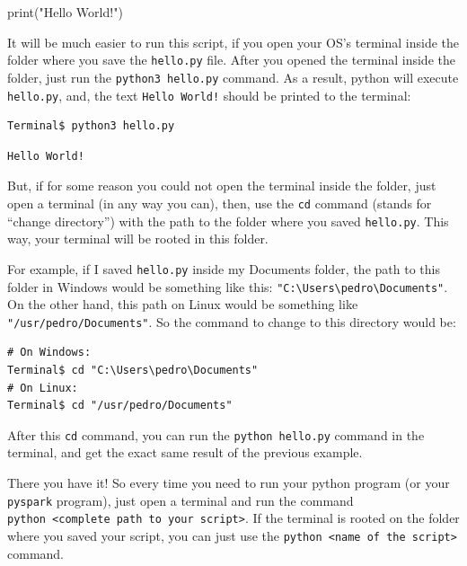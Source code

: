 \documentclass[
  11pt,
  letterpaper,
  DIV=11,
  numbers=noendperiod]{scrreprt}
\newenvironment{Shaded}{\begin{snugshade}}{\end{snugshade}}
\newcommand{\BuiltInTok}[1]{\textcolor[rgb]{0.00,0.23,0.31}{#1}}
\newcommand{\NormalTok}[1]{\textcolor[rgb]{0.00,0.23,0.31}{#1}}
\newcommand{\StringTok}[1]{\textcolor[rgb]{0.13,0.47,0.30}{#1}}
\begin{document}
\begin{Shaded}
\begin{Highlighting}[]
\BuiltInTok{print}\NormalTok{(}\StringTok{"Hello World!"}\NormalTok{)}
\end{Highlighting}
\end{Shaded}

It will be much easier to run this script, if you open your OS's
terminal inside the folder where you save the \texttt{hello.py} file.
After you opened the terminal inside the folder, just run the
\texttt{python3\ hello.py} command. As a result, python will execute
\texttt{hello.py}, and, the text \texttt{Hello\ World!} should be
printed to the terminal:

\begin{verbatim}
Terminal$ python3 hello.py
\end{verbatim}

\begin{verbatim}
Hello World!
\end{verbatim}

But, if for some reason you could not open the terminal inside the
folder, just open a terminal (in any way you can), then, use the
\texttt{cd} command (stands for ``change directory'') with the path to
the folder where you saved \texttt{hello.py}. This way, your terminal
will be rooted in this folder.

For example, if I saved \texttt{hello.py} inside my Documents folder,
the path to this folder in Windows would be something like this:
\texttt{"C:\textbackslash{}Users\textbackslash{}pedro\textbackslash{}Documents"}.
On the other hand, this path on Linux would be something like
\texttt{"/usr/pedro/Documents"}. So the command to change to this
directory would be:

\begin{verbatim}
# On Windows:
Terminal$ cd "C:\Users\pedro\Documents"
# On Linux:
Terminal$ cd "/usr/pedro/Documents"
\end{verbatim}

After this \texttt{cd} command, you can run the
\texttt{python\ hello.py} command in the terminal, and get the exact
same result of the previous example.

There you have it! So every time you need to run your python program (or
your \texttt{pyspark} program), just open a terminal and run the command
\texttt{python\ \textless{}complete\ path\ to\ your\ script\textgreater{}}.
If the terminal is rooted on the folder where you saved your script, you
can just use the
\texttt{python\ \textless{}name\ of\ the\ script\textgreater{}} command.
\end{document}
